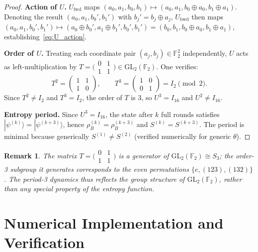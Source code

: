 \documentclass[11pt,a4paper]{article}
\newtheorem{remark}[theorem]{Remark}
\newcommand{\F}{\mathbb{F}}
\newcommand{\VNE}{S}
\begin{document}
\begin{proof}
\textbf{Action of $U$.}
$U_{\mathrm{fwd}}$ maps $(a_0, a_1, b_0, b_1) \mapsto (a_0, a_1, b_0 \oplus a_0, b_1 \oplus a_1)$.
Denoting the result $(a_0, a_1, b_0', b_1')$ with $b_j' = b_j \oplus a_j$,
$U_{\mathrm{bwd}}$ then maps
$(a_0, a_1, b_0', b_1') \mapsto (a_0 \oplus b_0', a_1 \oplus b_1', b_0', b_1')
= (b_0, b_1, b_0 \oplus a_0, b_1 \oplus a_1)$,
establishing~\eqref{eq:U_action}.

\textbf{Order of $U$.}
Treating each coordinate pair $(a_j, b_j) \in \F_2^2$ independently,
$U$ acts as left-multiplication by
$T = \bigl(\begin{smallmatrix} 0 & 1 \\ 1 & 1 \end{smallmatrix}\bigr) \in \mathrm{GL}_2(\F_2)$.
One verifies:
\begin{equation}
  T^2 = \begin{pmatrix} 1 & 1 \\ 1 & 0 \end{pmatrix}, \qquad
  T^3 = \begin{pmatrix} 1 & 0 \\ 0 & 1 \end{pmatrix} = I_2
  \pmod{2}.
\end{equation}
Since $T^2 \neq I_2$ and $T^3 = I_2$, the order of $T$ is $3$, so $U^3 = I_{16}$
and $U^2 \neq I_{16}$.

\textbf{Entropy period.}
Since $U^3 = I_{16}$, the state after $k$ full rounds satisfies
$|\psi^{(k)}\rangle = |\psi^{(k+3)}\rangle$, hence
$\rho_B^{(k)} = \rho_B^{(k+3)}$ and $\VNE^{(k)} = \VNE^{(k+3)}$.
The period is minimal because generically
$\VNE^{(1)} \neq \VNE^{(2)}$ (verified numerically for generic $\theta$).
\end{proof}

\begin{remark}
The matrix $T = \bigl(\begin{smallmatrix} 0 & 1 \\ 1 & 1 \end{smallmatrix}\bigr)$
is a generator of $\mathrm{GL}_2(\F_2) \cong S_3$; the order-3 subgroup it
generates corresponds to the even permutations $\{e, (123), (132)\}$.
The period-3 dynamics thus reflects the group structure of $\mathrm{GL}_2(\F_2)$,
rather than any special property of the entropy function.
\end{remark}

\section{Numerical Implementation and Verification}
\label{sec:implementation}
\end{document}
